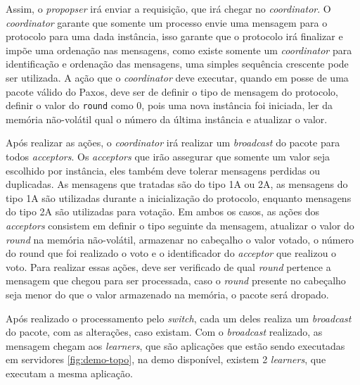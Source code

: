 \documentclass[
    12pt,
    openright, 
    oneside,
    a4paper,
    french,
    english,
    brazil
    ]{facom-ufu-abntex2}
\theoremstyle{definition}
\begin{document}


Assim, o \emph{propopser} irá enviar a requisição, que irá chegar no \emph{coordinator}. O \emph{coordinator} garante que
somente um processo envie uma mensagem para o protocolo para uma dada instância, isso garante 
que o protocolo irá finalizar e impõe uma ordenação nas mensagens, como existe somente um
\emph{coordinator} para identificação e ordenação das mensagens, uma simples sequência crescente pode ser
utilizada. A ação que o \emph{coordinator} deve executar, quando em posse de uma pacote válido do Paxos,
deve ser de definir o tipo de mensagem do protocolo, definir o valor do \texttt{round} como 0, pois
uma nova instância foi iniciada, ler da memória não-volátil qual o número da última instância e atualizar
o valor\cite{dang2016paxos}.




Após realizar as ações, o \emph{coordinator} irá realizar um \emph{broadcast} do pacote para todos \emph{acceptors}.
Os \emph{acceptors} que irão assegurar que somente um valor seja escolhido por instância, eles também deve tolerar
mensagens perdidas ou duplicadas. As mensagens que tratadas são do tipo 1A ou 2A, as mensagens do
tipo 1A são utilizadas durante a inicialização do protocolo, enquanto mensagens do tipo 2A são utilizadas
para votação. Em ambos os casos, as ações dos \emph{acceptors} consistem em definir o tipo seguinte da mensagem,
atualizar o valor do \emph{round} na memória não-volátil, armazenar no cabeçalho o valor votado, o número do
round que foi realizado o voto e o identificador do \emph{acceptor} que realizou o voto. Para realizar
essas ações, deve ser verificado de qual \emph{round} pertence a mensagem que chegou para ser processada,
caso o \emph{round} presente no cabeçalho seja menor do que o valor armazenado na memória, o pacote será 
dropado\cite{dang2016paxos}.



Após realizado o processamento pelo \emph{switch}, cada um deles realiza um \emph{broadcast} do pacote,
com as alterações, caso existam. Com o \emph{broadcast} realizado, as mensagem chegam aos
\emph{learners}, que são aplicações que estão sendo executadas em servidores \ref{fig:demo-topo}, 
na demo disponível, existem 2 \emph{learners}, que executam a mesma aplicação.
\end{document}
